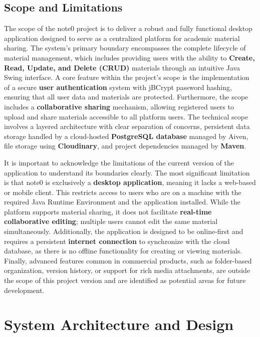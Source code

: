 \documentclass[12pt, a4paper]{report}
\begin{document}
\section{Scope and Limitations}

The scope of the note0 project is to deliver a robust and fully functional desktop application designed to serve as a centralized platform for academic material sharing. The system's primary boundary encompasses the complete lifecycle of material management, which includes providing users with the ability to \textbf{Create, Read, Update, and Delete (CRUD)} materials through an intuitive Java Swing interface. A core feature within the project's scope is the implementation of a secure \textbf{user authentication} system with jBCrypt password hashing, ensuring that all user data and materials are protected. Furthermore, the scope includes a \textbf{collaborative sharing} mechanism, allowing registered users to upload and share materials accessible to all platform users. The technical scope involves a layered architecture with clear separation of concerns, persistent data storage handled by a cloud-hosted \textbf{PostgreSQL database} managed by Aiven, file storage using \textbf{Cloudinary}, and project dependencies managed by \textbf{Maven}.

It is important to acknowledge the limitations of the current version of the application to understand its boundaries clearly. The most significant limitation is that note0 is exclusively a \textbf{desktop application}, meaning it lacks a web-based or mobile client. This restricts access to users who are on a machine with the required Java Runtime Environment and the application installed. While the platform supports material sharing, it does not facilitate \textbf{real-time collaborative editing}; multiple users cannot edit the same material simultaneously. Additionally, the application is designed to be online-first and requires a persistent \textbf{internet connection} to synchronize with the cloud database, as there is no offline functionality for creating or viewing materials. Finally, advanced features common in commercial products, such as folder-based organization, version history, or support for rich media attachments, are outside the scope of this project version and are identified as potential areas for future development.


\chapter{System Architecture and Design}
\end{document}

